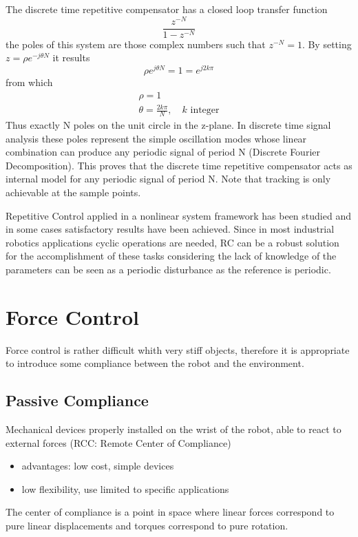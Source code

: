 \documentclass{book}
\begin{document}
The discrete time repetitive compensator has a closed loop transfer function 
\[
    \displaystyle\frac{z^{-N}}{1-z^{-N}}
\]
the poles of this system are those complex numbers such that $z^{-N}=1$. By setting $z=\rho e^{-j\theta N}$ it results 
\[
    \rho e^{j\theta N} = 1 = e^{j2k\pi}
\]
from which 
\begin{align*}
    \rho = 1 \\
    \theta = \displaystyle\frac{2k\pi}{N}, \quad k \text{ integer}
\end{align*}
Thus exactly N poles on the unit circle in the z-plane. In discrete time signal analysis these poles represent the simple oscillation modes whose linear combination can produce any periodic signal of period N (Discrete Fourier Decomposition). This proves that the discrete time repetitive compensator acts as internal model for any periodic signal of period N. 
Note that tracking is only achievable at the sample points. 

Repetitive Control applied in a nonlinear system framework has been studied and in some cases satisfactory results have been achieved. Since in most industrial robotics applications cyclic operations are needed, RC can be a robust solution for the accomplishment of these tasks considering the lack of knowledge of the parameters can be seen as a periodic disturbance as the reference is periodic. 


\chapter{Force Control}
Force control is rather difficult whith very stiff objects, therefore it is appropriate to introduce some compliance between the robot and the environment. 
\section{Passive Compliance}
Mechanical devices properly installed on the wrist of the robot, able to react to external forces (RCC: Remote Center of Compliance)
\begin{itemize}
    \item advantages: low cost, simple devices
    \item low flexibility, use limited to specific applications
\end{itemize}
The center of compliance is a point in space where linear forces correspond to pure linear displacements and torques correspond to pure rotation.
\end{document}
